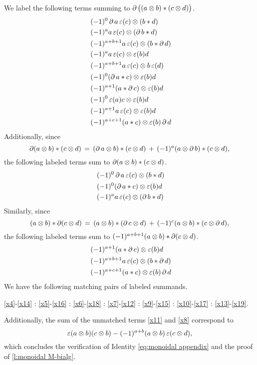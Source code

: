We label the following terms summing to $\operatorname{\partial}\big((a \otimes b) \ast (c \otimes d)\big)$.
\begin{align}& \label{x4}
	(-1)^0 \bd a \aug(c) \ot (b \ast d) \sk{} \label{x5}
	(-1)^{a} a \aug(c) \ot (\bd b \ast d) \sk{} \label{x6}
	(-1)^{a+b+1} a \aug(c) \ot (b \ast \bd d) \sk{} \label{x7}
	(-1)^a a \aug(c) \ot \aug(b) d \sk{} \label{x8}
	(-1)^{a+b+1} a \aug(c) \ot b \aug(d) \sk{} \label{x9}
	(-1)^0 (\bd a \ast c) \ot \aug(b) d \sk{} \label{x10}
	(-1)^{a+1} (a \ast \bd c) \ot \aug(b) d \sk{} \label{x11}
	(-1)^0 \aug(a) c \ot \aug(b) d \sk{} \label{x12}
	(-1)^{a+1} a \aug(c) \ot \aug(b) d \sk{} \label{x13}
	(-1)^{a+c+1} (a \ast c) \ot \aug(b) \bd d
\end{align}
Additionally, since
\begin{equation*}
	\operatorname{\partial} (a \otimes b) \ast (c \otimes d) \,=\,
	(\operatorname{\partial} a \otimes b) \ast (c \otimes d) \,+\,
	(-1)^a (a \otimes \operatorname{\partial} b) \ast (c \otimes d),
\end{equation*}
the following labeled terms sum to $\operatorname{\partial} (a \otimes b) \ast (c \otimes d)$.
\begin{align}& \label{x14}
	(-1)^0 \bd a \aug(c) \ot (b \ast d) \sk{} \label{x15}
	(-1)^0 (\bd a \ast c) \ot \aug(b) d \sk{} \label{x16}
	(-1)^{a} a \aug(c) \ot (\bd b \ast d)
\end{align}
Similarly, since
\begin{equation*}
	(a \otimes b) \ast \operatorname{\partial} (c \otimes d) \,=\,
	(a \otimes b) \ast (\operatorname{\partial} c \otimes d) \,+\,
	(-1)^{c} (a \otimes b) \ast (c \otimes \operatorname{\partial} d),
\end{equation*}
the following labeled terms sum to $(-1)^{a+b+1}(a \otimes b) \ast \operatorname{\partial} (c \otimes d)$.
\begin{align}& \label{x17}
	(-1)^{a+1} (a \ast \bd c) \ot \aug(b) d \sk{} \label{x18}
	(-1)^{a+b+1} a \aug(c) \ot (b \ast \bd d) \sk{} \label{x19}
	(-1)^{a+c+1} (a \ast c) \ot \aug(b) \bd d
\end{align}
We have the following matching pairs of labeled summands.
\begin{center}
	\eqref{x4}-\eqref{x14} :
	\eqref{x5}-\eqref{x16} :
	\eqref{x6}-\eqref{x18} :
	\eqref{x7}-\eqref{x12} :
	\eqref{x9}-\eqref{x15} :
	\eqref{x10}-\eqref{x17} :
	\eqref{x13}-\eqref{x19}.
\end{center}
Additionally, the sum of the unmatched terms \eqref{x11} and \eqref{x8} correspond to
\[
\operatorname{\varepsilon}(a \otimes b) (c \otimes b) - (-1)^{a+b} (a \otimes b) \operatorname{\varepsilon}(c \otimes d),
\]
which concludes the verification of Identity \eqref{eq:monoidal appendix} and the proof of \cref{l:monoidal M-bialg}.